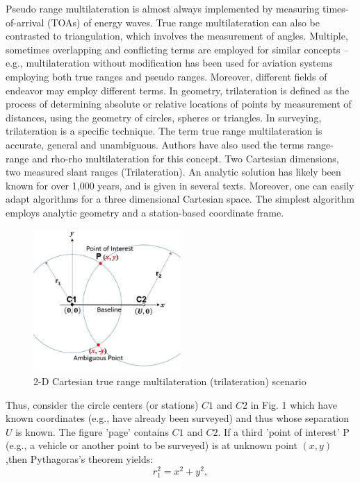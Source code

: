 Pseudo range multilateration is almost always implemented by measuring times-of-arrival (TOAs) 
of energy waves. True range multilateration can also be contrasted to triangulation, 
which involves the measurement of angles.
Multiple, sometimes overlapping and conflicting terms are employed for similar concepts – e.g., 
multilateration without modification has been used for aviation systems employing both true ranges
and pseudo ranges. Moreover, different fields of endeavor may employ different terms. 
In geometry, trilateration is defined as the process of determining absolute or relative locations 
of points by measurement of distances, using the geometry of circles, spheres or triangles.
In surveying, trilateration is a specific technique. The term true range multilateration is 
accurate, general and unambiguous. Authors have also used the terms range-range and rho-rho 
multilateration for this concept.
Two Cartesian dimensions, two measured slant ranges (Trilateration). 
An analytic solution has likely been known for over 1,000 years, and is given in several texts.
Moreover, one can easily adapt algorithms for a three dimensional Cartesian space.
The simplest algorithm employs analytic geometry and a station-based coordinate frame.
\begin{figure}[htb] 
	\label{fig:two_beacon_local}
	\centering
	\includegraphics[width=0.5\textwidth]{figures/two_beacon_local}
	\caption{2-D Cartesian true range multilateration (trilateration) scenario}
\end{figure}
Thus, consider the circle centers (or stations) $C1$ and $C2$ in Fig. 1 which have known 
coordinates (e.g., have already been surveyed) and thus whose separation $U$ is known. 
The figure 'page' contains $C1$ and $C2$. If a third 'point of interest' P (e.g., a vehicle or
another point to be surveyed) is at unknown point $(x,y)$  ,then Pythagoras's theorem yields:
\begin{equation}
	\label{equ:ptyhagoras1}
	r_{1}^{2} = x^{2} + y^{2},
\end{equation}
